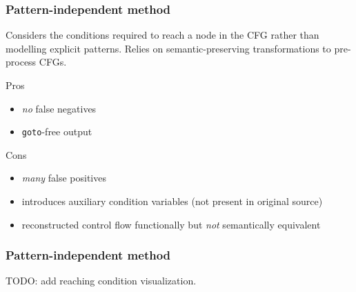 \documentclass[aspectratio=1610]{beamer}
\begin{document}

\begin{frame}
	\frametitle{Pattern-independent method}

	Considers the conditions required to reach a node in the CFG rather than modelling explicit patterns. Relies on semantic-preserving transformations to pre-process CFGs.

	\vspace*{2em}

	\begin{block}{Pros}
		\begin{itemize}
			\item \textit{no} false negatives
			\item \texttt{goto}-free output
		\end{itemize}
	\end{block}

	\begin{block}{Cons}
		\begin{itemize}
			\item \textit{many} false positives
			\item introduces auxiliary condition variables (not present in original source)
			\item reconstructed control flow functionally but \textit{not} semantically equivalent
		\end{itemize}
	\end{block}




\end{frame}

\begin{frame}
	\frametitle{Pattern-independent method}
	TODO: add reaching condition visualization.

\end{frame}

\end{document}
